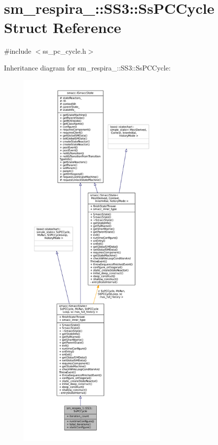 \hypertarget{structsm__respira__1_1_1SS3_1_1SsPCCycle}{}\section{sm\+\_\+respira\+\_\+:\+:S\+S3\+:\+:Ss\+P\+C\+Cycle Struct Reference}
\label{structsm__respira__1_1_1SS3_1_1SsPCCycle}


{\ttfamily \#include $<$ss\+\_\+pc\+\_\+cycle.\+h$>$}



Inheritance diagram for sm\+\_\+respira\+\_\+:\+:S\+S3\+:\+:Ss\+P\+C\+Cycle\+:
\nopagebreak
\begin{figure}[H]
\begin{center}
\leavevmode
\includegraphics[height=550pt]{structsm__respira__1_1_1SS3_1_1SsPCCycle__inherit__graph}
\end{center}
\end{figure}



